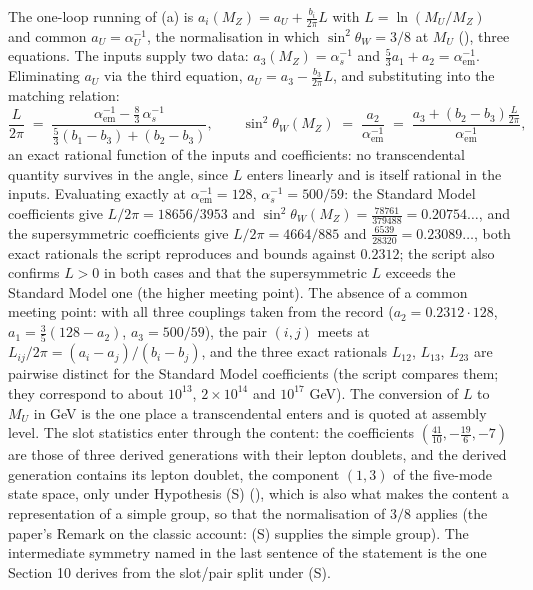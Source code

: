 The one-loop running of (a) is $a_{i}(M_{Z}) = a_{U} + \tfrac{b_{i}}{2\pi} L$ with $L = \ln(M_{U}/M_{Z})$ and common $a_{U} = \alpha_{U}^{-1}$, the normalisation in which $\sin^{2}\theta_{W} = 3/8$ at $M_{U}$ (), three equations. The inputs supply two data: $a_{3}(M_{Z}) = \alpha_{s}^{-1}$ and $\tfrac53 a_{1} + a_{2} = \alpha_{\mathrm{em}}^{-1}$. Eliminating $a_{U}$ via the third equation, $a_{U} = a_{3} - \tfrac{b_{3}}{2\pi}L$, and substituting into the matching relation:
\[
\frac{L}{2\pi} \;=\; \frac{\alpha_{\mathrm{em}}^{-1} - \tfrac83\, \alpha_{s}^{-1}}{\tfrac53(b_{1} - b_{3}) + (b_{2} - b_{3})},
\qquad
\sin^{2}\theta_{W}(M_{Z}) \;=\; \frac{a_{2}}{\alpha_{\mathrm{em}}^{-1}} \;=\; \frac{a_{3} + (b_{2} - b_{3})\tfrac{L}{2\pi}}{\alpha_{\mathrm{em}}^{-1}},
\]
an exact rational function of the inputs and coefficients: no transcendental quantity survives in the angle, since $L$ enters linearly and is itself rational in the inputs. Evaluating exactly at $\alpha_{\mathrm{em}}^{-1} = 128$, $\alpha_{s}^{-1} = 500/59$: the Standard Model coefficients give $L/2\pi = 18656/3953$ and $\sin^{2}\theta_{W}(M_{Z}) = \tfrac{78761}{379488} = 0.20754\ldots$, and the supersymmetric coefficients give $L/2\pi = 4664/885$ and $\tfrac{6539}{28320} = 0.23089\ldots$, both exact rationals the script reproduces and bounds against $0.2312$; the script also confirms $L > 0$ in both cases and that the supersymmetric $L$ exceeds the Standard Model one (the higher meeting point). The absence of a common meeting point: with all three couplings taken from the record ($a_{2} = 0.2312 \cdot 128$, $a_{1} = \tfrac35(128 - a_{2})$, $a_{3} = 500/59$), the pair $(i, j)$ meets at $L_{ij}/2\pi = (a_{i} - a_{j})/(b_{i} - b_{j})$, and the three exact rationals $L_{12}$, $L_{13}$, $L_{23}$ are pairwise distinct for the Standard Model coefficients (the script compares them; they correspond to about $10^{13}$, $2 \times 10^{14}$ and $10^{17}$ GeV). The conversion of $L$ to $M_{U}$ in GeV is the one place a transcendental enters and is quoted at assembly level. The slot statistics enter through the content: the coefficients $(\tfrac{41}{10}, -\tfrac{19}{6}, -7)$ are those of three derived generations with their lepton doublets, and the derived generation contains its lepton doublet, the component $(1,3)$ of the five-mode state space, only under Hypothesis (S) (), which is also what makes the content a representation of a simple group, so that the normalisation of $3/8$ applies (the paper's Remark on the classic account: (S) supplies the simple group). The intermediate symmetry named in the last sentence of the statement is the one Section 10 derives from the slot/pair split under (S).
